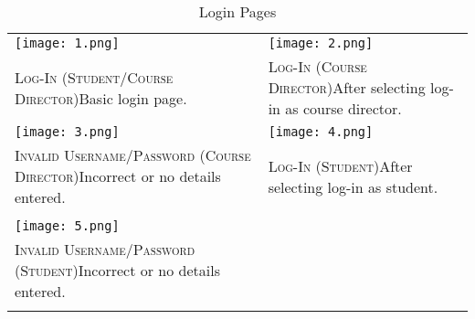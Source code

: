 \documentclass[11pt, english]{article}
\begin{document}
	\begin{center}
                \scriptsize
        \begin{longtable}{p{7cm}p{7cm}}
		\texttt{[image: 1.png]} & \texttt{[image: 2.png]}\\
		\textsc{Log-In (Student/Course Director)}\newline Basic login page. & \textsc{Log-In (Course Director)}\newline After selecting log-in as course director.\\
		\texttt{[image: 3.png]} & \texttt{[image: 4.png]}\\
		\textsc{Invalid Username/Password (Course Director)}\newline Incorrect or no details entered. & \textsc{Log-In (Student)}\newline After selecting log-in as student.\\
		& \\
		\texttt{[image: 5.png]} & \\
		\textsc{Invalid Username/Password (Student)}\newline Incorrect or no details entered. & \\ 
                \caption{Login Pages}
        \end{longtable}
        \end{center}
\end{document}
